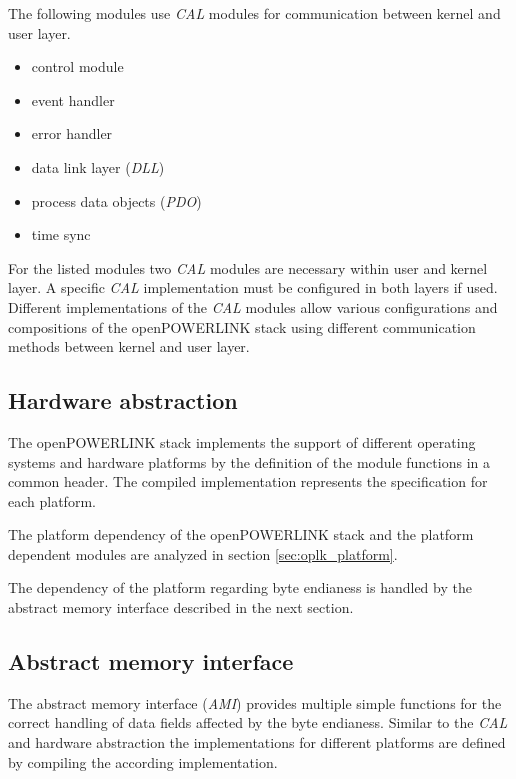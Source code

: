 The following modules use \emph{CAL} modules for communication between kernel and user layer. 

\begin{itemize}
    \item control module
    \item event handler
    \item error handler
    \item data link layer (\emph{DLL})
    \item process data objects (\emph{PDO})
    \item time sync
\end{itemize}

For the listed modules two \emph{CAL} modules are necessary within user and kernel layer.
A specific \emph{CAL} implementation must be configured in both layers if used.
Different implementations of the \emph{CAL} modules allow various configurations and compositions of the openPOWERLINK stack using different communication methods between kernel and user layer. \cite[CAL]{openpowerlink_doc}

\subsection{Hardware abstraction}
\label{sec:oplk_architecture_hardware}
The openPOWERLINK stack implements the support of different operating systems and hardware platforms by the definition of the module functions in a common header.
The compiled implementation represents the specification for each platform.

The platform dependency of the openPOWERLINK stack and the platform dependent modules are analyzed in section \ref{sec:oplk_platform}.

The dependency of the platform regarding byte endianess is handled by the abstract memory interface described in the next section.

\subsection{Abstract memory interface}
\label{sec:oplk_architecture_ami}

The abstract memory interface (\emph{AMI}) provides multiple simple functions for the correct handling of data fields affected by the byte endianess.
Similar to the \emph{CAL} and hardware abstraction the implementations for different platforms are defined by compiling the according implementation. \cite[AMI]{openpowerlink_doc}
\\

